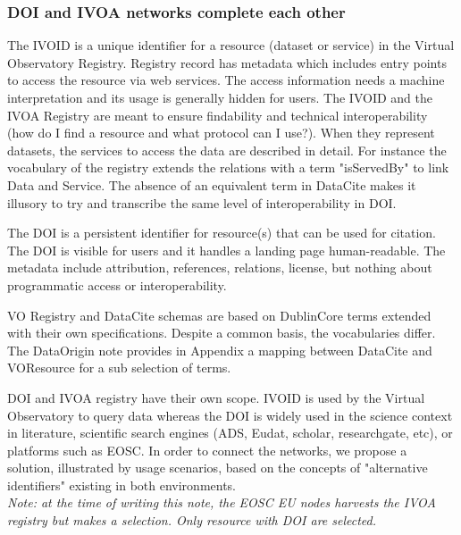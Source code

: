 \documentclass[11pt,a4paper]{ivoa}
\begin{document}
\subsubsection{DOI and IVOA networks complete each other}\hypertarget{doi-and-ivoa-networks-complete-each-other}{}\label{doi-and-ivoa-networks-complete-each-other}

The IVOID  is a unique identifier for a resource (dataset or service) in the Virtual Observatory Registry. Registry record has metadata which includes entry points to access the resource via web services. The access information needs a machine interpretation and its usage is generally hidden for users.\newline
The IVOID and the IVOA Registry are meant to ensure findability and technical interoperability (how do I find a resource and what protocol can I use?). When they represent datasets, the services to access the data are described in detail. For instance the vocabulary of the registry extends the relations with a term "isServedBy" to link Data and Service. The absence of an equivalent term in DataCite makes it illusory to try and transcribe the same level of interoperability in DOI.

The DOI is a persistent identifier for resource(s) that can be used for citation. The DOI is visible for users and it handles a landing page human-readable. The metadata include attribution, references, relations, license, but nothing about programmatic access or interoperability.

VO Registry and DataCite schemas are based on DublinCore terms extended with their own specifications. Despite a common basis, the vocabularies differ. The DataOrigin note provides in Appendix a mapping between DataCite and VOResource for a sub selection of terms. 

DOI and IVOA registry have their own scope. IVOID is used by the Virtual Observatory to query data whereas the DOI is widely used in the science context in literature, scientific search engines (ADS, Eudat, scholar, researchgate, etc), or platforms such as EOSC. In order to connect the networks, we propose a solution, illustrated by usage scenarios, based on the concepts of "alternative identifiers" existing in both environments.\\

\emph{Note: at the time of writing this note, the EOSC EU nodes harvests the IVOA registry but makes a selection. Only resource with DOI are selected. }
\end{document}
